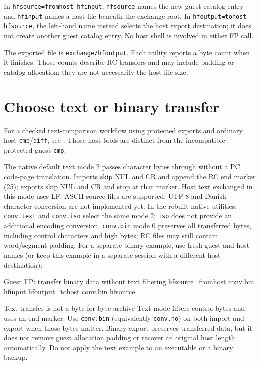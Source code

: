 In \passthrough{\lstinline!hfsource=fromhost hfinput!}, \passthrough{\lstinline!hfsource!} names the new guest catalog entry and \passthrough{\lstinline!hfinput!} names a host file beneath the exchange root. In \passthrough{\lstinline!hfoutput=tohost hfsource!}, the left-hand name instead selects the host export destination; it does not create another guest catalog entry. No host shell is involved in either FP call.

The exported file is \passthrough{\lstinline!exchange/hfoutput!}. Each utility reports a byte count when it finishes. Those counts describe RC transfers and may include padding or catalog allocation; they are not necessarily the host file size.

\section{Choose text or binary transfer}\label{choose-text-or-binary-transfer}
For a checked text-comparison workflow using protected exports and ordinary
host \texttt{cmp}/\texttt{diff}, see
.
Those host tools are distinct from the incompatible protected guest \texttt{cmp}.


The native default text mode 2 passes character bytes through without a PC code-page translation. Imports skip NUL and CR and append the RC end marker (25); exports skip NUL and CR and stop at that marker. Host text exchanged in this mode uses LF. ASCII source files are supported; UTF-8 and Danish character conversion are not implemented yet. In the rebuilt native utilities, \passthrough{\lstinline!conv.text!} and \passthrough{\lstinline!conv.iso!} select the same mode 2; \passthrough{\lstinline!iso!} does not provide an additional encoding conversion. \passthrough{\lstinline!conv.bin!} mode 0 preserves all transferred bytes, including control characters and high bytes; RC files may still contain word/segment padding. For a separate binary example, use fresh guest and host names (or keep this example in a separate session with a different host destination):

\begin{commandexample}{Guest FP: transfer binary data without text filtering}
hfsource=fromhost conv.bin hfinput
hfoutput=tohost conv.bin hfsource
\end{commandexample}

\begin{operationnote}{Text transfer is not a byte-for-byte archive}
Text mode filters control bytes and uses an end marker. Use \passthrough{\lstinline!conv.bin!} (equivalently \passthrough{\lstinline!conv.no!}) on both import and export when those bytes matter. Binary export preserves transferred data, but it does not remove guest allocation padding or recover an original host length automatically. Do not apply the text example to an executable or a binary backup.
\end{operationnote}

